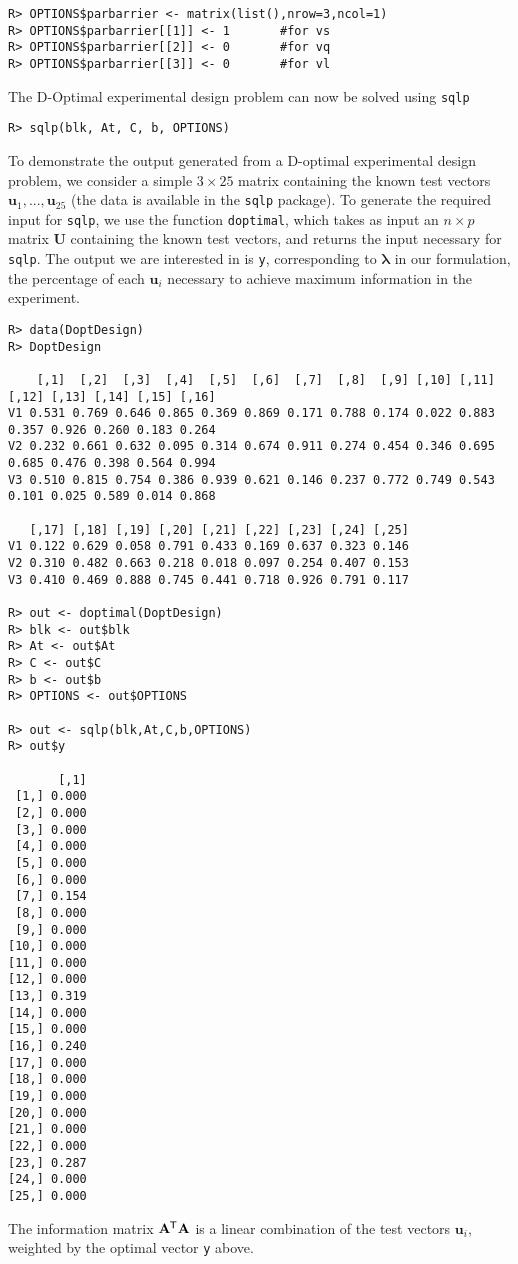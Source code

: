 \documentclass{article}
\newcommand{\ve}[1]{\mathbf{#1}}           %
\newcommand{\sv}[1]{\boldsymbol{#1}}   %
\newcommand{\m}[1]{\mathbf{#1}}               %
\newcommand{\tr}[1]{{#1}^{\mkern-1.5mu\mathsf{T}}}              %
\begin{document}
\begin{verbatim}
R> OPTIONS$parbarrier <- matrix(list(),nrow=3,ncol=1)
R> OPTIONS$parbarrier[[1]] <- 1       #for vs
R> OPTIONS$parbarrier[[2]] <- 0       #for vq
R> OPTIONS$parbarrier[[3]] <- 0       #for vl
\end{verbatim}

The D-Optimal experimental design problem can now be solved using \verb!sqlp!

\begin{verbatim}
R> sqlp(blk, At, C, b, OPTIONS)
\end{verbatim}

To demonstrate the output generated from a D-optimal experimental design problem, we consider a simple $3 \times 25$ matrix containing the known test vectors $\ve{u}_{1},...,\ve{u}_{25}$ (the data is available in the \verb!sqlp! package). To generate the required input for \verb!sqlp!, we use the function \verb!doptimal!, which takes as input an $n \times p$ matrix $\m{U}$ containing the known test vectors, and returns the input necessary for \verb!sqlp!. The output we are interested in is \verb!y!, corresponding to $\sv{\lambda}$ in our formulation, the percentage of each $\ve{u}_{i}$ necessary to achieve maximum information in the experiment.

\begin{verbatim}
R> data(DoptDesign)
R> DoptDesign

    [,1]  [,2]  [,3]  [,4]  [,5]  [,6]  [,7]  [,8]  [,9] [,10] [,11] [,12] [,13] [,14] [,15] [,16]
V1 0.531 0.769 0.646 0.865 0.369 0.869 0.171 0.788 0.174 0.022 0.883 0.357 0.926 0.260 0.183 0.264
V2 0.232 0.661 0.632 0.095 0.314 0.674 0.911 0.274 0.454 0.346 0.695 0.685 0.476 0.398 0.564 0.994
V3 0.510 0.815 0.754 0.386 0.939 0.621 0.146 0.237 0.772 0.749 0.543 0.101 0.025 0.589 0.014 0.868

   [,17] [,18] [,19] [,20] [,21] [,22] [,23] [,24] [,25]
V1 0.122 0.629 0.058 0.791 0.433 0.169 0.637 0.323 0.146
V2 0.310 0.482 0.663 0.218 0.018 0.097 0.254 0.407 0.153
V3 0.410 0.469 0.888 0.745 0.441 0.718 0.926 0.791 0.117

R> out <- doptimal(DoptDesign)
R> blk <- out$blk
R> At <- out$At
R> C <- out$C
R> b <- out$b
R> OPTIONS <- out$OPTIONS

R> out <- sqlp(blk,At,C,b,OPTIONS)
R> out$y

       [,1]
 [1,] 0.000
 [2,] 0.000
 [3,] 0.000
 [4,] 0.000
 [5,] 0.000
 [6,] 0.000
 [7,] 0.154
 [8,] 0.000
 [9,] 0.000
[10,] 0.000
[11,] 0.000
[12,] 0.000
[13,] 0.319
[14,] 0.000
[15,] 0.000
[16,] 0.240
[17,] 0.000
[18,] 0.000
[19,] 0.000
[20,] 0.000
[21,] 0.000
[22,] 0.000
[23,] 0.287
[24,] 0.000
[25,] 0.000
\end{verbatim}

The information matrix $\tr{\m{A}}\m{A}$ is a linear combination of the test vectors $\ve{u}_{i}$, weighted by the optimal vector \verb!y! above. 



\end{document}

